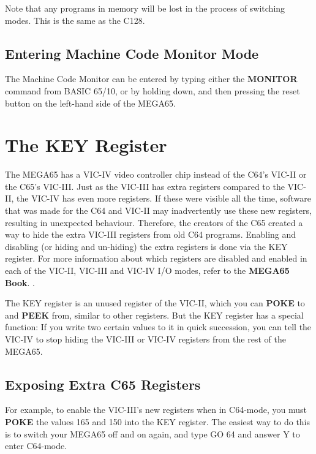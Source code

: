 Note that any programs in memory will be lost in the process of switching modes. This is the same as the C128.

\subsection{Entering Machine Code Monitor Mode}

The Machine Code Monitor can be entered by typing either the {\bf MONITOR}
command from BASIC 65/10, or by holding 
down, and then pressing the reset button on the left-hand side of the
MEGA65.

\section{The KEY Register}

The MEGA65 has a VIC-IV video controller chip instead of the C64's VIC-II or
the C65's VIC-III.  Just as the VIC-III has extra registers compared to the
VIC-II, the VIC-IV has even more registers.  If these were visible all the time,
software that was made for the C64 and VIC-II may inadvertently use these
new registers, resulting in unexpected behaviour.  Therefore, the
creators of the C65 created a way to hide the extra VIC-III registers from old
C64 programs. Enabling and disabling (or hiding and un-hiding) the extra registers is done via the KEY register. For more information
about which registers are disabled and enabled in each of the
VIC-II, VIC-III and VIC-IV I/O modes, refer to
\ifdefined\printmanual
 the {\bf MEGA65 Book}.
\else
 .
\fi


The KEY register is an unused register of the VIC-II, which you can {\bf POKE} to and
 {\bf PEEK} from, similar to other registers. But the KEY register has a special function: If
you write two certain values to it in quick succession, you can tell the VIC-IV
to stop hiding the VIC-III or VIC-IV registers from the rest of the MEGA65.

\subsection{Exposing Extra C65 Registers}

For example, to enable the VIC-III's new registers when in C64-mode, you must {\bf POKE} the values 165 and 150
into the KEY register. The easiest way to do this is to switch your MEGA65 off and on again, and type GO 64
and answer Y to enter C64-mode.

